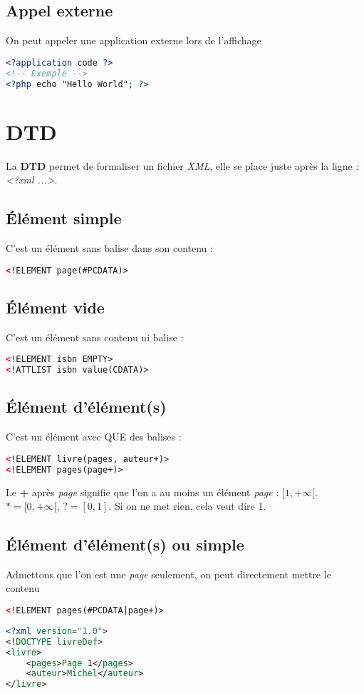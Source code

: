         \subsection{Appel externe}
            On peut appeler une application externe lors de l'affichage
            \begin{lstlisting}[language=XML]
<?application code ?>
<!-- Exemple -->
<?php echo "Hello World"; ?>
            \end{lstlisting}
    \section{DTD}
        La \textbf{DTD} permet de formaliser un fichier \textit{XML}, elle se place juste après la ligne : \textit{<?xml ...>}.
        \subsection{Élément simple}
            C'est un élément sans balise dans son contenu :
            \begin{lstlisting}[language=XML]
<!ELEMENT page(#PCDATA)>
            \end{lstlisting}
        \subsection{Élément vide}
            C'est un élément sans contenu ni balise :
            \begin{lstlisting}[language=XML]
<!ELEMENT isbn EMPTY>
<!ATTLIST isbn value(CDATA)>
            \end{lstlisting}
        \subsection{Élément d'élément(s)}
            C'est un élément avec QUE des balises :
            \begin{lstlisting}[language=XML]
<!ELEMENT livre(pages, auteur+)>
<!ELEMENT pages(page+)>
            \end{lstlisting}
            Le \textbf{+} après \textit{page} signifie que l'on a au moins un élément \textit{page} : $[1, +\infty[$. $* = [0, +\infty[$, $? = [0,1]$. Si on ne met rien, cela veut dire 1.
        \subsection{Élément d'élément(s) ou simple}
            Admettons que l'on est une \textit{page} seulement, on peut directement mettre le contenu
            \begin{lstlisting}[language=XML]
<!ELEMENT pages(#PCDATA|page+)>
            \end{lstlisting}
            \begin{lstlisting}[language=XML]
<?xml version="1.0">
<!DOCTYPE livreDef>
<livre>
	<pages>Page 1</pages>
	<auteur>Michel</auteur>
</livre>
            \end{lstlisting}
